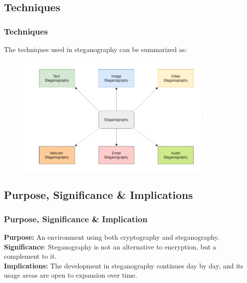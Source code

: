 \documentclass[12pt,hyperref={unicode}]{beamer}
\begin{document}
\subsection{Techniques}
\begin{frame}
\frametitle{Techniques}
The techniques used in steganography can be summarized as:\\
\begin{figure}[h]
\includegraphics[width=10cm, height=6cm]{techniques.png}
\end{figure}
\end{frame}


\subsection{Purpose, Significance \& Implications}
\begin{frame}
\frametitle{Purpose, Significance \& Implication}
\textbf{Purpose:} An environment using both cryptography and steganography.\\\pause
\textbf{Significance}: Steganography is not an alternative to encryption, but a complement to it.\\\pause
\textbf{Implications:} The development in steganography continues day by day, and its usage areas are open to expansion over time.
\end{frame}

\end{document}
